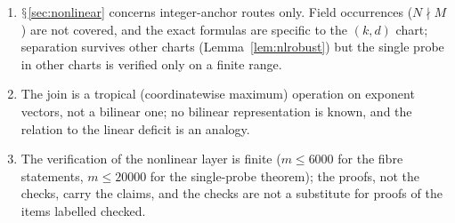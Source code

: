 \documentclass[11pt,a4paper]{article}
\renewcommand{\S}{\ensuremath{\mathsection}}
\theoremstyle{plain}
\theoremstyle{definition}
\begin{document}
\begin{enumerate}[label=(L\arabic*)]
\item \S\ref{sec:nonlinear} concerns integer-anchor routes only. Field occurrences ($N\nmid M$) are not covered, and the exact formulas are specific to the $(k,d)$ chart; separation survives other charts (Lemma~\ref{lem:nlrobust}) but the single probe in other charts is verified only on a finite range.
\item The join is a tropical (coordinatewise maximum) operation on exponent vectors, not a bilinear one; no bilinear representation is known, and the relation to the linear deficit is an analogy.
\item The verification of the nonlinear layer is finite ($m\le6000$ for the fibre statements, $m\le20000$ for the single-probe theorem); the proofs, not the checks, carry the claims, and the checks are not a substitute for proofs of the items labelled checked.
\end{enumerate}
\end{document}
